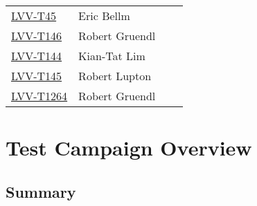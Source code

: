 \documentclass[DM,lsstdraft,STR,toc]{lsstdoc}
\begin{document}
{\begin{longtable}{p{3cm}p{3cm}p{3cm}p{6cm}}
\begin{minipage}[]{6cm}
\smallskip
{\small  }
\medskip
\end{minipage}
\\ \hline
\href{https://jira.lsstcorp.org/secure/Tests.jspa#/testCase/LVV-T45}{LVV-T45}
& {\small Eric Bellm } & {\small  } &
\begin{minipage}[]{6cm}
\smallskip
{\small  }
\medskip
\end{minipage}
\\ \hline
\href{https://jira.lsstcorp.org/secure/Tests.jspa#/testCase/LVV-T146}{LVV-T146}
& {\small Robert Gruendl } & {\small  } &
\begin{minipage}[]{6cm}
\smallskip
{\small  }
\medskip
\end{minipage}
\\ \hline
\href{https://jira.lsstcorp.org/secure/Tests.jspa#/testCase/LVV-T144}{LVV-T144}
& {\small Kian-Tat Lim } & {\small  } &
\begin{minipage}[]{6cm}
\smallskip
{\small  }
\medskip
\end{minipage}
\\ \hline
\href{https://jira.lsstcorp.org/secure/Tests.jspa#/testCase/LVV-T145}{LVV-T145}
& {\small Robert Lupton } & {\small  } &
\begin{minipage}[]{6cm}
\smallskip
{\small  }
\medskip
\end{minipage}
\\ \hline
\href{https://jira.lsstcorp.org/secure/Tests.jspa#/testCase/LVV-T1264}{LVV-T1264}
& {\small Robert Gruendl } & {\small  } &
\begin{minipage}[]{6cm}
\smallskip
{\small  }
\medskip
\end{minipage}
\\ \hline
\end{longtable}
}

\newpage

\section{Test Campaign Overview}
\label{sect:overview}

\subsection{Summary}
\label{sect:summarytable}
\end{document}
